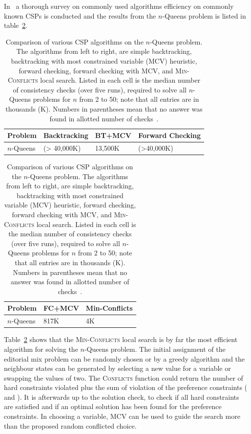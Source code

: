 In~ a thorough survey on commonly used algorithms efficiency on commonly known CSPs is conducted and the results from the $n$-Queens problem is listed in table~\ref{tab:nQueen}.
\begin{table}[ht!p]
\caption{Comparison of various CSP algorithms on the $n$-Queens problem. The algorithms from left to right, are simple backtracking, backtracking with most constrained variable (MCV) heuristic, forward checking, forward checking with MCV, and \textsc{Min-Conflicts} local search. Listed in each cell is the median number of consistency checks (over five runs), required to solve all $n$-Queens problems for $n$ from 2 to 50; note that all entries are in thousands (K).  Numbers in parentheses mean that no answer was found in allotted number of checks~\protect{}.}
\label{tab:nQueen}
	\begin{tabular}{|l|l|l|l|}
		\hline
		Problem& Backtracking& BT+MCV& Forward Checking\\
		\hline
		$n$-Queens& (> 40,000K)& 13,500K& (>40,000K)\\
		\hline
	\end{tabular}
	
	\begin{minipage}{\textwidth}
	\vspace{10pt}
		\begin{tabular}{|l|l|l|}
			\hline
			Problem& FC+MCV& Min-Conflicts\\
			\hline
			$n$-Queens& 817K& 4K\\
			\hline
		\end{tabular}
	\end{minipage}

\end{table}

Table~\ref{tab:nQueen} shows that the \textsc{Min-Conflicts} local search is by far the most efficient algorithm for solving the $n$-Queens problem. The initial assignment of the editorial mix problem can be randomly chosen or by a greedy algorithm and the neighbour states can be generated by selecting a new value for a variable or swapping the values of two. The \textsc{Conflicts} function could return the number of hard constraints violated plus the sum of violation of the preference constraints (\cite[pp. 372]{CPApt} and ). It is afterwards up to the solution check, to check if all hard constraints are satisfied and if an optimal solution has been found for the preference constraints. In choosing a variable, MCV can be used to guide the search more than the proposed random conflicted choice.

